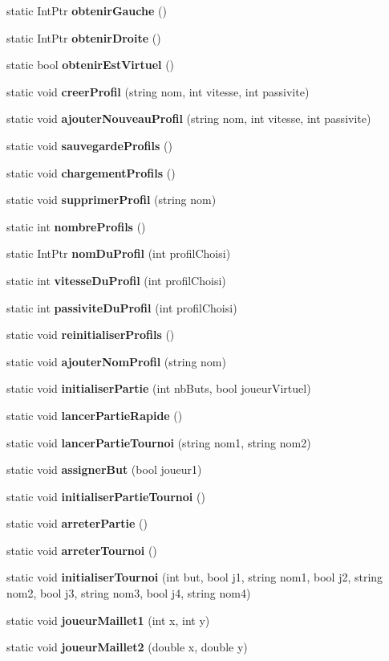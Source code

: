 \begin{DoxyCompactItemize}
\item 
static Int\+Ptr {\bfseries obtenir\+Gauche} ()
\item 
static Int\+Ptr {\bfseries obtenir\+Droite} ()
\item 
static bool {\bfseries obtenir\+Est\+Virtuel} ()
\item 
static void {\bfseries creer\+Profil} (string nom, int vitesse, int passivite)
\item 
static void {\bfseries ajouter\+Nouveau\+Profil} (string nom, int vitesse, int passivite)
\item 
static void {\bfseries sauvegarde\+Profils} ()
\item 
static void {\bfseries chargement\+Profils} ()
\item 
static void {\bfseries supprimer\+Profil} (string nom)
\item 
static int {\bfseries nombre\+Profils} ()
\item 
static Int\+Ptr {\bfseries nom\+Du\+Profil} (int profil\+Choisi)
\item 
static int {\bfseries vitesse\+Du\+Profil} (int profil\+Choisi)
\item 
static int {\bfseries passivite\+Du\+Profil} (int profil\+Choisi)
\item 
static void {\bfseries reinitialiser\+Profils} ()
\item 
static void {\bfseries ajouter\+Nom\+Profil} (string nom)
\item 
static void {\bfseries initialiser\+Partie} (int nb\+Buts, bool joueur\+Virtuel)
\item 
static void {\bfseries lancer\+Partie\+Rapide} ()
\item 
static void {\bfseries lancer\+Partie\+Tournoi} (string nom1, string nom2)
\item 
static void {\bfseries assigner\+But} (bool joueur1)
\item 
static void {\bfseries initialiser\+Partie\+Tournoi} ()
\item 
static void {\bfseries arreter\+Partie} ()
\item 
static void {\bfseries arreter\+Tournoi} ()
\item 
static void {\bfseries initialiser\+Tournoi} (int but, bool j1, string nom1, bool j2, string nom2, bool j3, string nom3, bool j4, string nom4)
\item 
static void {\bfseries joueur\+Maillet1} (int x, int y)
\item 
static void {\bfseries joueur\+Maillet2} (double x, double y)
\item 

\end{DoxyCompactItemize}
